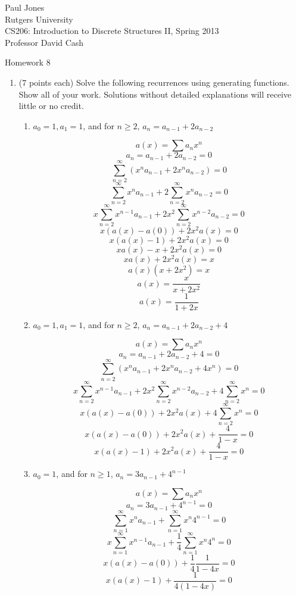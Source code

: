 \documentclass[11pt]{article}
\begin{document}
\sloppy

\noindent Paul Jones \\
Rutgers University\\
CS206: Introduction to Discrete Structures II, Spring 2013\\
Professor David Cash\\

\begin{center}
Homework 8
\end{center}

\begin{enumerate}

\item (7 points each) Solve the following recurrences using generating
functions.  Show all of your work.  Solutions without detailed
explanations will receive little or no credit.
\begin{enumerate}
	\item $a_0 = 1, a_1=1$, and for $n \geq 2$, $a_n = a_{n-1} + 2a_{n-2}$

	\[ a(x) = \sum a_n x^n \]
	\[ a_n = a_{n - 1} + 2a_{n - 2} = 0 \]
	\[ \sum_{n = 2}^{\infty} \left(x^n a_{n - 1} + 2 x^n a_{n - 2} \right) = 0 \]
	\[ \sum_{n = 2}^{\infty} x^n a_{n - 1} + 2 \sum_{n = 2}^{\infty} x^n a_{n - 2} = 0 \]
	\[ x \sum_{n = 2}^{\infty} x^{n - 1} a_{n - 1} + 2 x^2 \sum_{n = 2}^{\infty} x^{n - 2} a_{n - 2} = 0 \]	
	\[ x (a(x) - a(0)) + 2 x^2 a(x) = 0 \]
	\[ x (a(x) - 1) + 2 x^2 a(x)  = 0\]	
	\[ x a(x) - x + 2 x^2 a(x) = 0\]
	\[ x a(x) + 2 x^2 a(x) = x\]
	\[ a(x) (x + 2 x^2) = x\]
	\[ a(x) = \frac{x}{x + 2 x^2}\]	
	\[ a(x) = \frac{1}{1 + 2 x}\]	

	\clearpage

	\item $a_0 = 1, a_1=1$, and for $n\geq 2$, $a_n = a_{n-1} + 2 a_{n-2} + 4$

	\[ a(x) = \sum a_n x^n \]
	\[ a_n = a_{n-1} + 2 a_{n-2} + 4 = 0 \]
	\[ \sum_{n = 2}^{\infty} \left(x^n a_{n - 1} + 2 x^n a_{n - 2} + 4 x^n\right) = 0 \]
	\[ x \sum_{n = 2}^{\infty} x^{n - 1} a_{n - 1} + 2x^2 \sum_{n = 2}^{\infty} x^{n - 2} a_{n - 2} + 4 \sum_{n = 2}^{\infty} x^n = 0 \]
	\[ x (a(x) - a(0)) + 2x^2 a(x) + 4 \sum_{n = 2}^{\infty} x^n = 0 \]
	\[ x (a(x) - a(0)) + 2x^2 a(x) + \frac{4}{1 - x} = 0 \]
	\[ x (a(x) - 1) + 2x^2 a(x) + \frac{4}{1 - x} = 0 \]

	\clearpage

	\item $a_0 = 1$, and for $n\geq 1$, $a_n = 3a_{n-1} + 4^{n-1}$

	\[ a(x) = \sum a_n x^n \]
	\[ a_n = 3a_{n-1} + 4^{n-1} = 0\]
	\[ \sum_{n = 1}^\infty x^n a_{n-1} + \sum_{n = 1}^\infty x^n 4^{n-1} = 0\]
	\[ x \sum_{n = 1}^\infty x^{n -1} a_{n-1} + \frac{1}{4} \sum_{n = 1}^\infty x^n 4^{n} = 0 \]
	\[ x (a(x) - a(0)) + \frac{1}{4} \frac{1}{1 - 4x} = 0 \]
	\[ x (a(x) - 1) + \frac{1}{4(1 - 4x)} = 0 \]

\end{enumerate}
\end{enumerate}
\end{document}
